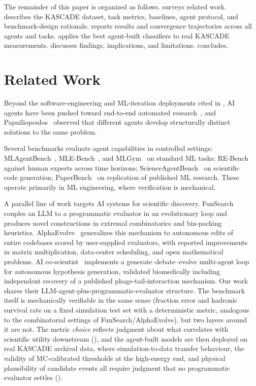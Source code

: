 \documentclass[universe,article,submit,pdftex,oneauthor]{Definitions/mdpi}
\begin{document}
The remainder of this paper is organized as follows.  surveys related work.  describes the KASCADE dataset, task metrics, baselines, agent protocol, and benchmark-design rationale.  reports results and convergence trajectories across all agents and tasks.  applies the best agent-built classifiers to real KASCADE measurements.  discusses findings, implications, and limitations.  concludes.

\section{Related Work}
\label{sec:related}

Beyond the software-engineering and ML-iteration deployments cited in , AI agents have been pushed toward end-to-end automated research~\cite{aiscientist}, and Papailiopoulos~\cite{papailiopoulos_adderboard} observed that different agents develop structurally distinct solutions to the same problem.

Several benchmarks evaluate agent capabilities in controlled settings: MLAgentBench~\cite{mlagentbench}, MLE-Bench~\cite{mlebench}, and MLGym~\cite{mlgym} on standard ML tasks; RE-Bench~\cite{rebench} against human experts across time horizons; ScienceAgentBench~\cite{scienceagentbench} on scientific code generation; PaperBench~\cite{paperbench} on replication of published ML research. These operate primarily in ML engineering, where verification is mechanical.

A parallel line of work targets AI systems for scientific discovery. FunSearch~\cite{funsearch} couples an LLM to a programmatic evaluator in an evolutionary loop and produces novel constructions in extremal combinatorics and bin-packing heuristics. AlphaEvolve~\cite{alphaevolve} generalizes this mechanism to autonomous edits of entire codebases scored by user-supplied evaluators, with reported improvements in matrix multiplication, data-center scheduling, and open mathematical problems. AI co-scientist~\cite{ai_coscientist} implements a generate--debate--evolve multi-agent loop for autonomous hypothesis generation, validated biomedically including independent recovery of a published phage-tail-interaction mechanism. Our work shares their LLM-agent-plus-programmatic-evaluator structure. The benchmark itself is mechanically verifiable in the same sense (fraction error and hadronic survival rate on a fixed simulation test set with a deterministic metric, analogous to the combinatorial settings of FunSearch/AlphaEvolve), but two layers around it are not. The metric \emph{choice} reflects judgment about what correlates with scientific utility downstream (), and the agent-built models are then deployed on real KASCADE archival data, where simulation-to-data transfer behaviour, the validity of MC-calibrated thresholds at the high-energy end, and physical plausibility of candidate events all require judgment that no programmatic evaluator settles ().
\end{document}
